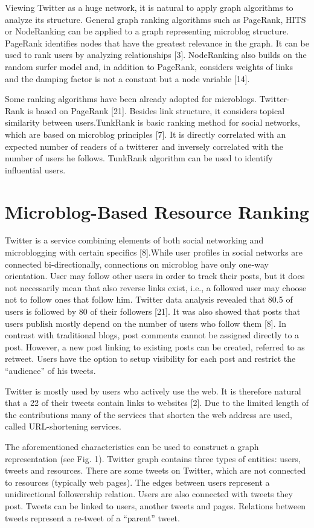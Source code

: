 \documentclass[]{article}
\begin{document}
Viewing Twitter as a huge network, it is natural to apply graph algorithms to
analyze its structure. General graph ranking algorithms such as PageRank, HITS
or NodeRanking can be applied to a graph representing microblog structure.
PageRank identifies nodes that have the greatest relevance in the graph. It can
be used to rank users by analyzing relationships [3]. NodeRanking also builds
on the random surfer model and, in addition to PageRank, considers weights of
links and the damping factor is not a constant but a node variable [14].

Some ranking algorithms have been already adopted for microblogs. Twitter-
Rank is based on PageRank [21]. Besides link structure, it considers topical similarity
between users.TunkRank is basic ranking method for social networks, which
are based on microblog principles [7]. It is directly correlated with an expected number of readers of a twitterer and inversely correlated with the number of users
he follows. TunkRank algorithm can be used to identify influential users.

\section{Microblog-Based Resource Ranking}
Twitter is a service combining elements of both social networking and microblogging
with certain specifics [8].While user profiles in social networks are connected
bi-directionally, connections on microblog have only one-way orientation. User
may follow other users in order to track their posts, but it does not necessarily
mean that also reverse links exist, i.e., a followed user may choose not to follow
ones that follow him. Twitter data analysis revealed that 80.5  of users
is followed by 80  of their followers [21]. It was also showed that posts that
users publish mostly depend on the number of users who follow them [8]. In
contrast with traditional blogs, post comments cannot be assigned directly to a
post. However, a new post linking to existing posts can be created, referred to
as retweet. Users have the option to setup visibility for each post and restrict
the “audience” of his tweets.

Twitter is mostly used by users who actively use the web. It is therefore
natural that a 22  of their tweets contain links to websites [2]. Due to the
limited length of the contributions many of the services that shorten the web
address are used, called URL-shortening services.

The aforementioned characteristics can be used to construct a graph representation
(see Fig. 1). Twitter graph contains three types of entities: users, tweets
and resources. There are some tweets on Twitter, which are not connected to resources
(typically web pages). The edges between users represent a unidirectional
followership relation. Users are also connected with tweets they post. Tweets can
be linked to users, another tweets and pages. Relations between tweets represent
a re-tweet of a “parent” tweet.
\end{document}
